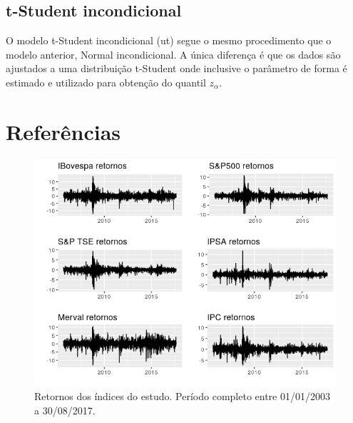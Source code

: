 \documentclass[1p]{elsarticle}
\theoremstyle{definition}
\begin{document}
\subsection{t-Student incondicional}

O modelo t-Student incondicional (ut) segue o mesmo procedimento que o modelo anterior, Normal incondicional. A única diferença é que os dados são ajustados a uma distribuição t-Student onde inclusive o parâmetro de forma é estimado e utilizado para obtenção do quantil $z_\alpha$.

\section*{Referências}



\begin{figure}[H]
	\centering
	\includegraphics[width=1\linewidth]{figs/artigo-retornos}
	\caption{Retornos dos índices do estudo. Período completo entre 01/01/2003 a 30/08/2017.}
	\label{fig:artigo-retornos}
\end{figure}
\end{document}
